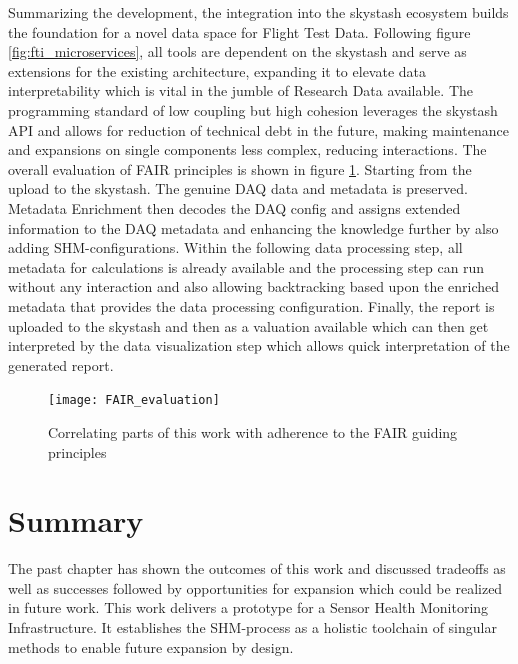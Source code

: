 Summarizing the development, the integration into the skystash ecosystem builds the foundation for a novel data space for Flight Test Data. Following figure \ref{fig:fti_microservices}, all tools are dependent on the skystash and serve as extensions for the existing architecture, expanding it to elevate data interpretability which is vital in the jumble of Research Data available. The programming standard of low coupling but high cohesion \cite{stevens_structured_1974} leverages the skystash API and allows for reduction of technical debt in the future, making maintenance and expansions on single components less complex, reducing interactions.
The overall evaluation of FAIR principles is shown in figure \ref{fig:FAIR_evaluation}. Starting from the upload to the skystash. The genuine DAQ data and metadata is preserved. Metadata Enrichment then decodes the DAQ config and assigns extended information to the DAQ metadata and enhancing the knowledge further by also adding SHM-configurations. Within the following data processing step, all metadata for calculations is already available and the processing step can run without any interaction and also allowing backtracking based upon the enriched metadata that provides the data processing configuration. Finally, the report is uploaded to the skystash and then as a valuation available which can then get interpreted by the data visualization step which allows quick interpretation of the generated report.


\begin{figure}
    \centering
    \texttt{[image: FAIR\_evaluation]}
    \caption{Correlating parts of this work with adherence to the FAIR guiding principles}
    \label{fig:FAIR_evaluation}
\end{figure}

\section{Summary}
The past chapter has shown the outcomes of this work and discussed tradeoffs as well as successes followed by opportunities for expansion which could be realized in future work.
This work delivers a prototype for a Sensor Health Monitoring Infrastructure. It establishes the SHM-process as a holistic toolchain of singular methods to enable future expansion by design.



